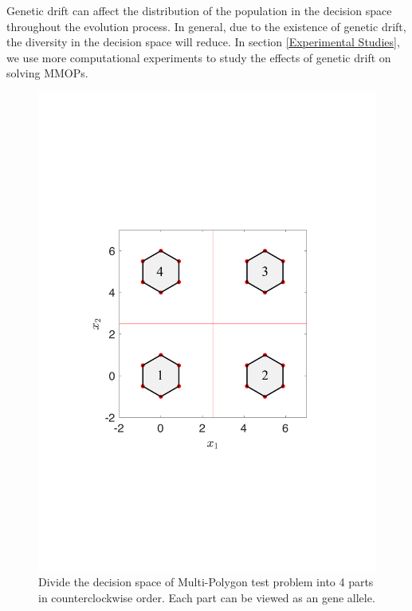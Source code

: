 \documentclass[conference]{IEEEtran}
\begin{document}
Genetic drift can affect the distribution of the population in the decision space throughout the evolution process. In general, due to the existence of genetic drift, the diversity in the decision space will reduce. In section \ref{Experimental Studies}, we use more computational experiments to study the effects of genetic drift on solving MMOPs.

\begin{figure}[htbp]
    \centering
    \includegraphics[width=.24\textwidth]{Section3/Alleles}
    \caption{Divide the decision space of Multi-Polygon test problem into 4 parts in counterclockwise order. Each part can be viewed as an gene allele.}
    \label{fig: Alleles}
\end{figure}
\end{document}
